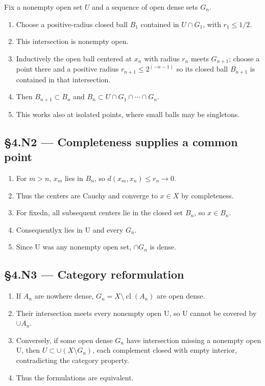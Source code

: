 \documentclass[preprint,12pt,aps,pra,showkeys,amsmath,amssymb,superscriptaddress,floatfix]{revtex4-2}
\theoremstyle{definition}
\theoremstyle{remark}
\begin{document}
Fix a nonempty open set \(U\) and a sequence of open dense sets \(G_n\).

\begin{enumerate}
\def\labelenumi{\arabic{enumi}.}
\item
  Choose a positive-radius closed ball \(B_{1}\) contained in
  \(U\cap G_{1}\), with \(r_{1}\le 1/2\).
\item
  This intersection is nonempty open.
\item
  Inductively the open ball centered at \(x_n\) with radius \(r_n\)
  meets \(G_{n+1}\); choose a point there and a positive radius
  \(r_{n+1}\le 2^{(-n-1)}\) so its closed ball \(B_{n+1}\) is contained
  in that intersection.
\item
  Then \(B_{n+1}\subset B_n\) and
  \(B_n\subset U\cap G_{1}\cap \cdots \cap G_n\).
\item
  This works also at isolated points, where small balls may be
  singletons.
\end{enumerate}

\subsection{§4.N2 --- Completeness supplies a common
point}\label{n2-completeness-supplies-a-common-point}

\begin{enumerate}
\def\labelenumi{\arabic{enumi}.}
\item
  For \(m>n\), \(x_m\) lies in \(B_n\), so \(d(x_m,x_n)\le r_n\to 0\).
\item
  Thus the centers are Cauchy and converge to \(x\in X\) by
  completeness.
\item
  For fixedn, all subsequent centers lie in the closed set \(B_n\), so
  \(x\in B_n\).
\item
  Consequentlyx lies in U and every \(G_n\).
\item
  Since U was any nonempty open set, \(\cap G_n\) is dense.
\end{enumerate}

\subsection{§4.N3 --- Category
reformulation}\label{n3-category-reformulation}

\begin{enumerate}
\def\labelenumi{\arabic{enumi}.}
\item
  If \(A_n\) are nowhere dense, \(G_n=X\setminus\operatorname{cl}(A_n)\)
  are open dense.
\item
  Their intersection meets every nonempty open U, so U cannot be covered
  by \(\cup A_n\).
\item
  Conversely, if some open dense \(G_n\) have intersection missing a
  nonempty open U, then \(U\subset \cup (X\setminus G_n)\), each
  complement closed with empty interior, contradicting the category
  property.
\item
  Thus the formulations are equivalent.
\end{enumerate}
\end{document}

